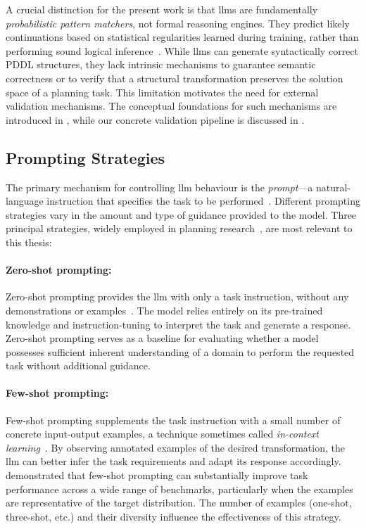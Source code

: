 A crucial distinction for the present work is that \glspl{llm} are fundamentally \emph{probabilistic pattern matchers}, not formal reasoning engines.
They predict likely continuations based on statistical regularities learned during training, rather than performing sound logical inference~\cite{Kambhampati2024, Valmeekam2023}.
While \glspl{llm} can generate syntactically correct PDDL structures, they lack intrinsic mechanisms to guarantee semantic correctness or to verify that a structural transformation preserves the solution space of a planning task.
This limitation motivates the need for external validation mechanisms. The conceptual foundations for such mechanisms are introduced in , while our concrete validation pipeline is discussed in .

\subsection{Prompting Strategies}
\label{sec:bg:prompting}

The primary mechanism for controlling \gls{llm} behaviour is the \emph{prompt}---a natural-language instruction that specifies the task to be performed~\cite{Brown2020}.
Different prompting strategies vary in the amount and type of guidance provided to the model.
Three principal strategies, widely employed in planning research~\cite{Georgievski2025, Elis2025}, are most relevant to this thesis:

\paragraph{Zero-shot prompting:}
Zero-shot prompting provides the \gls{llm} with only a task instruction, without any demonstrations or examples~\cite{Kojima2022}.
The model relies entirely on its pre-trained knowledge and instruction-tuning to interpret the task and generate a response.
Zero-shot prompting serves as a baseline for evaluating whether a model possesses sufficient inherent understanding of a domain to perform the requested task without additional guidance.

\paragraph{Few-shot prompting:}
Few-shot prompting supplements the task instruction with a small number of concrete input-output examples, a technique sometimes called \emph{in-context learning}~\cite{Brown2020}.
By observing annotated examples of the desired transformation, the \gls{llm} can better infer the task requirements and adapt its response accordingly.
\citeauthor{Brown2020}~\cite{Brown2020} demonstrated that few-shot prompting can substantially improve task performance across a wide range of benchmarks, particularly when the examples are representative of the target distribution.
The number of examples (one-shot, three-shot, etc.) and their diversity influence the effectiveness of this strategy.

